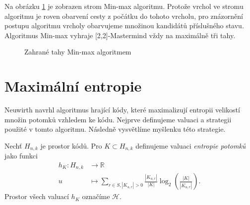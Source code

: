 Na obrázku \ref{fig22minmax} je zobrazen strom Min-max algoritmu. Protože vrchol ve stromu algoritmu je roven obarvení cesty z počátku do tohoto vrcholu, pro znázornění postupu algoritmu vrcholy obarvujeme množinou kandidátů příslušného stavu. Algoritmus Min-max vyhraje [2,2]-Mastermind vždy na maximálně tři tahy. 
\begin{figure}[h!]
    \centering
    \caption{Zahrané tahy Min-max algoritmem}
\label{fig22minmax}
\end{figure}



\section{Maximální entropie}
Neuwirth \cite{neuwirth} navrhl algoritmus hrající kódy, které maximalizují entropii velikostí množin potomků vzhledem ke kódu. Nejprve definujeme valuaci a strategii použité v tomto algoritmu. Následně vysvětlíme myšlenku této strategie.

\begin{definice}\label{defentropierozdeleni}
    Nechť $H_{n,k}$ je prostor kódů. Pro $K \subset H_{n,k}$ definujeme valuaci \emph{entropie potomků} jako funkci
    \begin{align*}
        h_K \colon H_{n,k} &\to \mathbb{R} \\
        u &\mapsto \sum_{r\in S, |K_{u,r}| > 0} \frac{|K_{u,r}|}{|K|}\log_2\left( \frac{|K|}{|K_{u,r}|} \right).
    \end{align*}
    Prostor všech valuací $h_K$ označíme $\mathcal{H}$. 
\end{definice}

